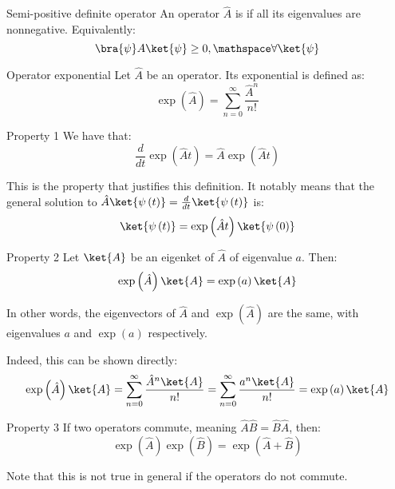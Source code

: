 \documentclass[a4paper]{article}
\begin{document}
\begin{parag}{Semi-positive definite operator}
    An operator $\hat{A}$ is  if all its eigenvalues are nonnegative. Equivalently: 
    \[\bra{\psi} A \ket{\psi} \geq 0, \mathspace \forall \ket{\psi}\]
\end{parag}

\begin{parag}{Operator exponential}
    Let $\hat{A}$ be an operator. Its exponential is defined as: 
    \[\exp\left(\hat{A}\right) = \sum_{n=0}^{\infty} \frac{\hat{A}^n}{n!}\]
    
    \begin{subparag}{Property 1}
        We have that: 
        \[\frac{d}{dt} \exp\left(\hat{A} t\right) = \hat{A} \exp\left(\hat{A} t\right)\]

        This is the property that justifies this definition. It notably means that the general solution to $\hat{A} \ket{\psi\left(t\right)} = \frac{d}{dt} \ket{\psi\left(t\right)}$ is: 
        \[\ket{\psi\left(t\right)} = \exp\left(\hat{A}t\right) \ket{\psi\left(0\right)}\]
    \end{subparag}

    \begin{subparag}{Property 2}
        Let $\ket{A}$ be an eigenket of $\hat{A}$ of eigenvalue $a$. Then: 
        \[\exp\left(\hat{A}\right)\ket{A} = \exp\left(a\right) \ket{A}\]

        In other words, the eigenvectors of $\hat{A}$ and $\exp\left(\hat{A}\right)$ are the same, with eigenvalues $a$ and $\exp\left(a\right)$ respectively.

        Indeed, this can be shown directly: 
        \[\exp\left(\hat{A}\right) \ket{A} = \sum_{n=0}^{\infty} \frac{\hat{A}^n \ket{A}}{n!} = \sum_{n=0}^{\infty} \frac{a^n \ket{A}}{n!} = \exp\left(a\right) \ket{A}\]
    \end{subparag}

    \begin{subparag}{Property 3}
        If two operators commute, meaning $\hat{A} \hat{B} = \hat{B}\hat{A}$, then: 
        \[\exp\left(\hat{A}\right) \exp\left(\hat{B}\right) = \exp\left(\hat{A} + \hat{B}\right)\]
        
        Note that this is not true in general if the operators do not commute.
    \end{subparag}
\end{parag}
\end{document}
